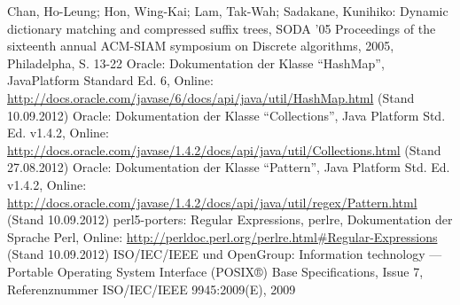 \documentclass{book}
\begin{document}
\begin{thebibliography}{99}
  Chan, Ho-Leung; Hon, Wing-Kai; Lam, Tak-Wah; Sadakane, Kunihiko: Dynamic dictionary matching and compressed suffix trees, SODA '05 Proceedings of the sixteenth annual ACM-SIAM symposium on Discrete algorithms, 2005, Philadelpha, S. 13-22
  Oracle: Dokumentation der Klasse "`HashMap"', Java\texttrademark Platform
Standard Ed. 6, Online: \url{http://docs.oracle.com/javase/6/docs/api/java/util/HashMap.html} (Stand 10.09.2012)
  Oracle: Dokumentation der Klasse "`Collections"', Java Platform
Std. Ed. v1.4.2, Online: \url{http://docs.oracle.com/javase/1.4.2/docs/api/java/util/Collections.html} (Stand 27.08.2012)
  Oracle: Dokumentation der Klasse "`Pattern"', Java Platform
 Std. Ed. v1.4.2, Online: \url{http://docs.oracle.com/javase/1.4.2/docs/api/java/util/regex/Pattern.html} (Stand 10.09.2012)
  perl5-porters: Regular Expressions, perlre, Dokumentation der Sprache Perl, Online: \url{http://perldoc.perl.org/perlre.html#Regular-Expressions} (Stand 10.09.2012)
  ISO/IEC/IEEE und OpenGroup: Information technology — Portable Operating System Interface (POSIX®) Base Specifications, Issue 7, Referenznummer ISO/IEC/IEEE 9945:2009(E), 2009
\end{thebibliography}

\begin{appendix}







\end{appendix}
\end{document}
